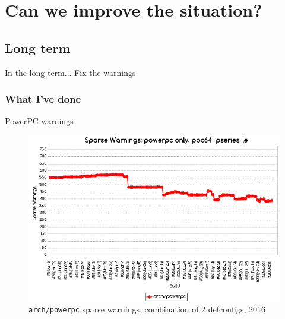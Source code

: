 \documentclass[pdf,aspectratio=169]{beamer}
\begin{document}
\section{Can we improve the situation?}
\label{sec-4}

\begin{frame}
  \tableofcontents[currentsection]
\end{frame}

\subsection{Long term}
\label{sec-4-1}


\begin{frame}{In the long term...}
  Fix the warnings
\end{frame}

\subsubsection{What I've done}
\label{sec-4-1-1}

\begin{frame}{PowerPC warnings}
  \begin{figure}[h!]
    \centering
    \includegraphics[scale=0.35]{warnings-ppc-no-spike}
    \caption{\texttt{arch/powerpc} sparse warnings, combination of 2 defconfigs, 2016}
    \label{fig:arch-powerpc-warnings-no-spike}
  \end{figure}
\end{frame}
\end{document}
